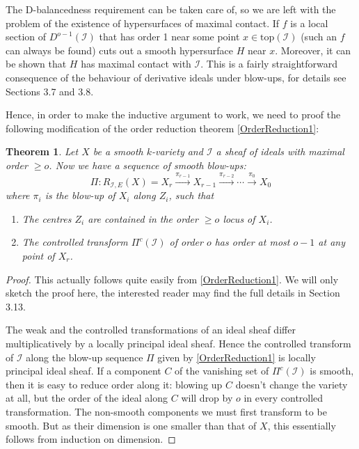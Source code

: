 \documentclass[12pt,a4paper,leqno]{article}
\newcommand{\fref}[1]{\hyperref[{#1}]{\ref*{#1}}}
\theoremstyle{plain}
\newtheorem{thm}[theo]{Theorem}
\theoremstyle{definition}
\theoremstyle{remark}
\begin{document}
The D-balancedness requirement can be taken care of, so we are left with the problem of the existence of hypersurfaces of maximal contact. If $f$ is a local section of $D^{o-1} (\mathscr{I})$ that has order 1 near some point $x \in \mathrm{top} (\mathscr{I})$ (such an $f$ can always be found) cuts out a smooth hypersurface $H$ near $x$. Moreover, it can be shown that $H$ has maximal contact with $\mathscr{I}$. This is a fairly straightforward consequence of the behaviour of derivative ideals under blow-ups, for details see \cite{Kol} Sections 3.7 and 3.8.

Hence, in order to make the inductive argument to work, we need to proof the following modification of the order reduction theorem \fref{OrderReduction1}:

\begin{thm}\label{MarkedOrderReduction}
Let $X$ be a smooth $k$-variety and $\mathscr{I}$ a sheaf of ideals with maximal order $\geq o$. Now we have a sequence of smooth blow-ups:
\begin{equation*}
\Pi: R_{\mathscr{I},E} (X) = X_r \stackrel{\pi_{r-1}}{\to} X_{r-1} \stackrel{\pi_{r-2}}{\to} \cdots \stackrel{\pi_{0}}{\to} X_0
\end{equation*}
where $\pi_i$ is the blow-up of $X_i$ along $Z_i$, such that
\begin{enumerate}
\item The centres $Z_i$ are contained in the order $\geq o$ locus of $X_i$.
\item The controlled transform $\Pi^{c}(\mathscr{I})$ of order $o$ has order at most $o-1$ at any point of $X_r$.
\end{enumerate}
\end{thm}
\begin{proof}
This actually follows quite easily from \fref{OrderReduction1}. We will only sketch the proof here, the interested reader may find the full details in \cite{Kol} Section 3.13. 

The weak and the controlled transformations of an ideal sheaf differ multiplicatively by a locally principal ideal sheaf. Hence the controlled transform of $\mathscr{I}$ along the blow-up sequence $\Pi$ given by \fref{OrderReduction1} is locally principal ideal sheaf. If a component $C$ of the vanishing set of $\Pi^c (\mathscr{I})$ is smooth, then it is easy to reduce order along it: blowing up $C$ doesn't change the variety at all, but the order of the ideal along $C$ will drop by $o$ in every controlled transformation. The non-smooth components we must first transform to be smooth. But as their dimension is one smaller than that of $X$, this essentially follows from induction on dimension.
\end{proof}
\end{document}
